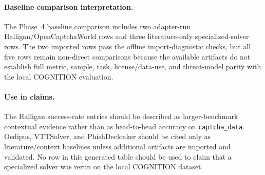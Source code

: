 \paragraph{Baseline comparison interpretation.}
The Phase~4 baseline comparison includes two adapter-run Halligan/OpenCaptchaWorld rows and three literature-only specialized-solver rows. The two imported rows pass the offline import-diagnostic checks, but all five rows remain non-direct comparisons because the available artifacts do not establish full metric, sample, task, license/data-use, and threat-model parity with the local COGNITION evaluation.

\paragraph{Use in claims.}
The Halligan success-rate entries should be described as larger-benchmark contextual evidence rather than as head-to-head accuracy on \texttt{captcha\_data}. Oedipus, VTTSolver, and PhishDecloaker should be cited only as literature/context baselines unless additional artifacts are imported and validated. No row in this generated table should be used to claim that a specialized solver was rerun on the local COGNITION dataset.
